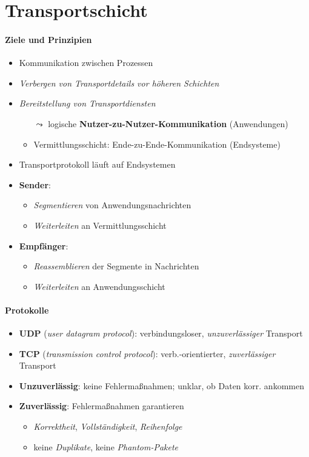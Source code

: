 \section{Transportschicht}

\paragraph{Ziele und Prinzipien}
\begin{itemize}
	\item Kommunikation zwischen Prozessen
  \item \emph{Verbergen von Transportdetails vor höheren Schichten}
  \item \emph{Bereitstellung von Transportdiensten}
  \begin{itemize}
    \item[\( \leadsto \)] logische \textbf{Nutzer-zu-Nutzer-Kommunikation} (Anwendungen)
    \item Vermittlungsschicht: Ende-zu-Ende-Kommunikation (Endsysteme)
  \end{itemize}
  \item Transportprotokoll läuft auf Endsystemen
  \item \textbf{Sender}:
  \begin{itemize}
    \item \emph{Segmentieren} von Anwendungsnachrichten
    \item \emph{Weiterleiten} an Vermittlungsschicht
  \end{itemize}
  \item \textbf{Empfänger}:
  \begin{itemize}
    \item \emph{Reassemblieren} der Segmente in Nachrichten
    \item \emph{Weiterleiten} an Anwendungsschicht
  \end{itemize}
\end{itemize}

\paragraph{Protokolle}
\begin{itemize}
  \item \textbf{UDP} (\emph{user datagram protocol}): verbindungsloser, \emph{unzuverlässiger} Transport
  \item \textbf{TCP} (\emph{transmission control protocol}): verb.-orientierter, \emph{zuverlässiger} Transport
  \item \textbf{Unzuverlässig}: keine Fehlermaßnahmen; unklar, ob Daten korr. ankommen
  \item \textbf{Zuverlässig}: Fehlermaßnahmen garantieren
  \begin{itemize}
    \item \emph{Korrektheit}, \emph{Vollständigkeit}, \emph{Reihenfolge}
    \item keine \emph{Duplikate}, keine \emph{Phantom-Pakete}
  \end{itemize}
\end{itemize}

